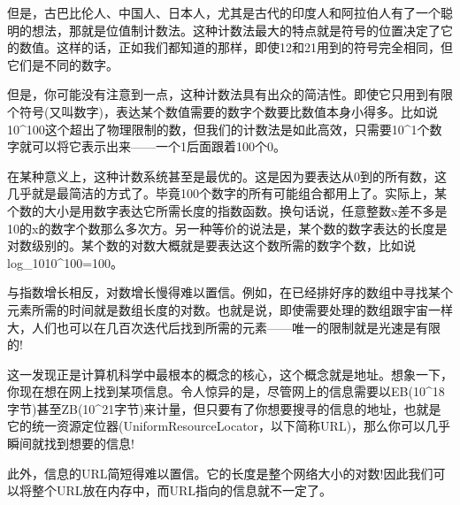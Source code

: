 但是，古巴比伦人、中国人、日本人，尤其是古代的印度人和阿拉伯人有了一个聪明的想法，那就是位值制计数法。这种计数法最大的特点就是符号的位置决定了它的数值。这样的话，正如我们都知道的那样，即使12和21用到的符号完全相同，但它们是不同的数字。

但是，你可能没有注意到一点，这种计数法具有出众的简洁性。即使它只用到有限个符号(又叫数字)，表达某个数值需要的数字个数要比数值本身小得多。比如说10^100这个超出了物理限制的数，但我们的计数法是如此高效，只需要10^1个数字就可以将它表示出来——一个1后面跟着100个0。

在某种意义上，这种计数系统甚至是最优的。这是因为要表达从0到的所有数，这几乎就是最简洁的方式了。毕竟100个数字的所有可能组合都用上了。实际上，某个数的大小是用数字表达它所需长度的指数函数。换句话说，任意整数x差不多是10的x的数字个数那么多次方。另一种等价的说法是，某个数的数字表达的长度是对数级别的。某个数的对数大概就是要表达这个数所需的数字个数，比如说log_1010^100=100。

与指数增长相反，对数增长慢得难以置信。例如，在已经排好序的数组中寻找某个元素所需的时间就是数组长度的对数。也就是说，即使需要处理的数组跟宇宙一样大，人们也可以在几百次迭代后找到所需的元素——唯一的限制就是光速是有限的!

这一发现正是计算机科学中最根本的概念的核心，这个概念就是地址。想象一下，你现在想在网上找到某项信息。令人惊异的是，尽管网上的信息需要以EB(10^18字节)甚至ZB(10^21字节)来计量，但只要有了你想要搜寻的信息的地址，也就是它的统一资源定位器(UniformResourceLocator，以下简称URL)，那么你可以几乎瞬间就找到想要的信息!

此外，信息的URL简短得难以置信。它的长度是整个网络大小的对数!因此我们可以将整个URL放在内存中，而URL指向的信息就不一定了。


